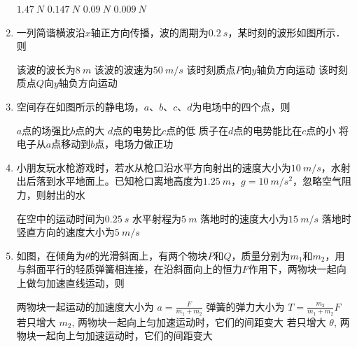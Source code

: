 \begin{enumerate}
\fourchoices
{$ 1.47 \ N $}
{$ 0.147 \ N $}
{$ 0.09 \ N $}
{$0.009 \ N $}



\item
一列简谐横波沿$ x $轴正方向传播，波的周期为$ 0.2 \ s $，某时刻的波形如图所示．则  
\begin{figure}[h!]
	\centering
	
\end{figure}

\fourchoices
{该波的波长为$ 8 \ m $}
{该波的波速为$ 50 \ m /s $}
{该时刻质点$ P $向$ y $轴负方向运动}
{该时刻质点$ Q $向$ y $轴负方向运动}


\item 
空间存在如图所示的静电场，$ a $、$ b $、$ c $、$ d $为电场中的四个点，则  
\begin{figure}[h!]
	\centering
	
\end{figure}

\fourchoices
{$ a $点的场强比$ b $点的大}
{$ d $点的电势比$ c $点的低}
{质子在$ d $点的电势能比在$ c $点的小}
{将电子从$ a $点移动到$ b $点，电场力做正功}




\item
小朋友玩水枪游戏时，若水从枪口沿水平方向射出的速度大小为$ 10 \ m /s $，水射出后落到水平地面上。已知枪口离地高度为$ 1.25 \ m $，$ g=10 \ m /s^{2} $，忽略空气阻力，则射出的水  

\fourchoices
{在空中的运动时间为$ 0.25 \ s $}
{水平射程为$ 5 \ m $}
{落地时的速度大小为$ 15 \ m /s $}
{落地时竖直方向的速度大小为$ 5 \ m /s $}




\item
如图，在倾角为$ \theta $的光滑斜面上，有两个物块$ P $和$ Q $，质量分别为$ m_{1} $和$ m_{2} $，用与斜面平行的轻质弹簧相连接，在沿斜面向上的恒力$ F $作用下，两物块一起向上做匀加速直线运动，则  
\begin{figure}[h!]
	\centering
	
\end{figure}

\fourchoices
{两物块一起运动的加速度大小为 $a=\frac{F}{m_{1}+m_{2}}$}
{弹簧的弹力大小为 $T=\frac{m_{2}}{m_{1}+m_{2}} F$}
{若只增大 $m_{2}$, 两物块一起向上匀加速运动时，它们的间距变大}
{若只增大 $\theta$, 两物块一起向上匀加速运动时，它们的间距变大}









\end{enumerate}
